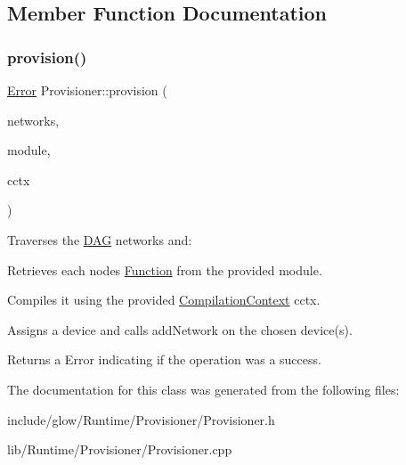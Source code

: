 \subsection{Member Function Documentation}
\mbox{\label{classglow_1_1runtime_1_1_provisioner_a6a8d183987f99cddcce7abfa90119ffd}} 
\subsubsection{\texorpdfstring{provision()}{provision()}}
{\footnotesize\ttfamily \hyperlink{namespaceglow_afdb176c3a672ef66db0ecfc19a8d39bf}{Error} Provisioner\+::provision (\begin{DoxyParamCaption}\item[{D\+A\+G\+List\+Ty \&}]{networks,  }\item[{\hyperlink{classglow_1_1_module}{Module} \&}]{module,  }\item[{\hyperlink{structglow_1_1_compilation_context}{Compilation\+Context} \&}]{cctx }\end{DoxyParamCaption})}

Traverses the \hyperlink{structglow_1_1runtime_1_1_d_a_g}{D\+AG} {\ttfamily networks} and\+:
\begin{DoxyEnumerate}
\item Retrieves each node\textquotesingle{}s \hyperlink{classglow_1_1_function}{Function} from the provided {\ttfamily module}.
\item Compiles it using the provided \hyperlink{structglow_1_1_compilation_context}{Compilation\+Context} {\ttfamily cctx}.
\item Assigns a device and calls add\+Network on the chosen device(s). \begin{DoxyReturn}{Returns}
a Error indicating if the operation was a success. 
\end{DoxyReturn}

\end{DoxyEnumerate}

The documentation for this class was generated from the following files\+:\begin{DoxyCompactItemize}
\item 
include/glow/\+Runtime/\+Provisioner/Provisioner.\+h\item 
lib/\+Runtime/\+Provisioner/Provisioner.\+cpp\end{DoxyCompactItemize}

